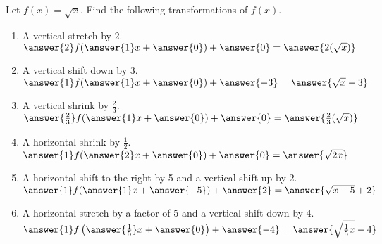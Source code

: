 \documentclass{ximera}
\author{David Kish}
\begin{document}
\begin{exercise}
Let $f(x) = \sqrt{x}$.  Find the following transformations of $f(x)$.
\begin{enumerate}
\item A vertical stretch by $2$.\\
$\answer{2}f(\answer{1}x+\answer{0})+\answer{0} = \answer{2(\sqrt{x})}$
\item  A vertical shift down by $3$.\\ 
$\answer{1}f(\answer{1}x+\answer{0})+\answer{-3} = \answer{\sqrt{x}-3}$
\item A vertical shrink by $\frac{2}{3}$.\\
$\answer{\frac{2}{3}}f(\answer{1}x+\answer{0})+\answer{0} = \answer{\frac{2}{3}(\sqrt{x})}$
\item A horizontal shrink by  $\frac{1}{2}$.\\
$\answer{1}f(\answer{2}x+\answer{0})+\answer{0} = \answer{\sqrt{2x}}$
\item A horizontal shift to the right by 5 and a vertical shift up by 2.\\ 
$\answer{1}f(\answer{1}x+\answer{-5})+\answer{2} = \answer{\sqrt{x-5}+2}$
\item A horizontal stretch by a factor of $5$ and a vertical shift down by $4$.\\ 
$\answer{1}f\left(\answer{\frac{1}{5}}x+\answer{0}\right)+\answer{-4} = \answer{\sqrt{\frac{1}{5}x}-4}$
\end{enumerate}
\end{exercise}
\end{document}
